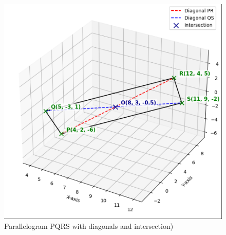 \documentclass[journal,12pt,onecolumn]{IEEEtran}
\theoremstyle{remark}
\begin{document}
\begin{figure}[H]
\centering
\includegraphics[width=0.5\columnwidth]{figs/graph.png}
\caption*{Parallelogram PQRS with diagonals and intersection)}
\label{fig:graph.png}
\end{figure}
\end{document}
